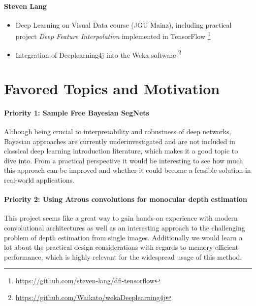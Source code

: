 \documentclass[11pt,english]{article}
\begin{document}
\paragraph{Steven Lang}
\begin{itemize}
	\setlength\itemsep{-0.25em}
	\item Deep Learning on Visual Data course (JGU Mainz), including practical project \textit{Deep Feature Interpolation} \cite{DBLP:journals/corr/UpchurchGBPSW16} implemented in TensorFlow \footnote{\url{https://github.com/steven-lang/dfi-tensorflow}}
	\item Integration of Deeplearning4j into the Weka software \footnote{\url{https://github.com/Waikato/wekaDeeplearning4j}}
\end{itemize}

\section{Favored Topics and Motivation}
\paragraph{Priority 1: Sample Free Bayesian SegNets} Although being crucial to interpretability and robustness of deep networks, Bayesian approaches are currently underinvestigated and are not included in classical deep learning introduction literature, which makes it a good topic to dive into. From a practical perspective it would be interesting to see how much this approach can be improved and whether it could become a feasible solution in real-world applications. 
\paragraph{Priority 2: Using Atrous convolutions for monocular depth estimation} This project seems like a great way to gain hands-on experience with modern convolutional architectures as well as an interesting approach to the challenging problem of depth estimation from single images. Additionally we would learn a lot about the practical design considerations with regards to memory-efficient performance, which is highly relevant for the widespread usage of this method.



\end{document}
